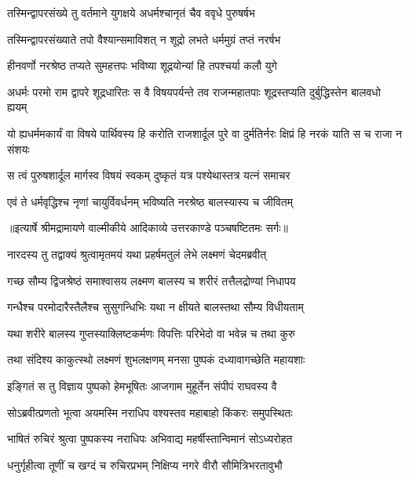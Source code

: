 \twolineshloka
{तस्मिन्द्वापरसंख्ये तु वर्तमाने युगक्षये}
{अधर्मश्चानृतं चैव ववृधे पुरुषर्षभ} %

\twolineshloka
{तस्मिन्द्वापरसंख्याते तपो वैश्यान्समाविशत्}
{न शूद्रो लभते धर्ममुग्रं तप्तं नरर्षभ} %

\twolineshloka
{हीनवर्णो नरश्रेष्ठ तप्यते सुमहत्तपः}
{भविष्या शूद्रयोन्यां हि तपश्चर्या कलौ युगे} %

\threelineshloka
{अधर्मः परमो राम द्वापरे शूद्रधारितः}
{स वै विषयपर्यन्ते तव राजन्महातपाः}
{शूद्रस्तप्यति दुर्बुद्धिस्तेन बालवधो ह्ययम्} %

\threelineshloka
{यो ह्यधर्ममकार्यं वा विषये पार्थिवस्य हि}
{करोति राजशार्दूल पुरे वा दुर्मतिर्नरः}
{क्षिप्रं हि नरकं याति स च राजा न संशयः} %

\twolineshloka
{स त्वं पुरुषशार्दूल मार्गस्व विषयं स्वकम्}
{दुष्कृतं यत्र पश्येथास्तत्र यत्नं समाचर} %

\twolineshloka
{एवं ते धर्मवृद्धिश्च नृणां चायुर्विवर्धनम्}
{भविष्यति नरश्रेष्ठ बालस्यास्य च जीवितम्} %


{॥इत्यार्षे श्रीमद्रामायणे वाल्मीकीये आदिकाव्ये उत्तरकाण्डे पञ्चषष्टितमः सर्गः॥}


\twolineshloka
{नारदस्य तु तद्वाक्यं श्रुत्वामृतमयं यथा}
{प्रहर्षमतुलं लेभे लक्ष्मणं चेदमब्रवीत्} %

\twolineshloka
{गच्छ सौम्य द्विजश्रेष्ठं समाश्वासय लक्ष्मण}
{बालस्य च शरीरं तत्तैलद्रोण्यां निधापय} %

\twolineshloka
{गन्धैश्च परमोदारैस्तैलैश्च सुसुगन्धिभिः}
{यथा न क्षीयते बालस्तथा सौम्य विधीयताम्} %

\twolineshloka
{यथा शरीरे बालस्य गुप्तस्याक्लिष्टकर्मणः}
{विपत्तिः परिभेदो वा भवेन्न च तथा कुरु} %

\twolineshloka
{तथा संदिश्य काकुत्स्थो लक्ष्मणं शुभलक्षणम्}
{मनसा पुष्पकं दध्यावागच्छेति महायशाः} %

\twolineshloka
{इङ्गितं स तु विज्ञाय पुष्पको हेमभूषितः}
{आजगाम मुहूर्तेन संपीपं राघवस्य वै} %

\twolineshloka
{सोऽब्रवीत्प्रणतो भूत्वा अयमस्मि नराधिप}
{वश्यस्तव महाबाहो किंकरः समुपस्थितः} %

\twolineshloka
{भाषितं रुचिरं श्रुत्वा पुष्पकस्य नराधिपः}
{अभिवाद्य महर्षीस्तान्विमानं सोऽध्यरोहत} %

\twolineshloka
{धनुर्गृहीत्वा तूणीं च खग्दं च रुचिरप्रभम्}
{निक्षिप्य नगरे वीरौ सौमित्रिभरतावुभौ} %

